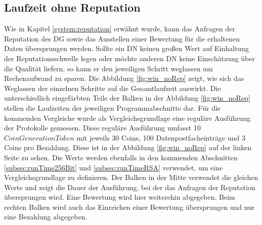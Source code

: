 \documentclass[
	fontsize=11pt,
	headings=small,
	parskip=half,           %
	bibliography=totoc,
	numbers=noenddot,       %
	open=any,               %
]{scrreprt}
\begin{document}
\subsection{Laufzeit ohne Reputation}
\label{subsec:noRep}
Wie in Kapitel \ref{system:reputation} erwähnt wurde, kann das Anfragen der Reputation des DG sowie das Ausstellen einer Bewertung für die erhaltenen Daten übersprungen werden. Sollte ein DN keinen großen Wert auf Einhaltung der Reputationsschwelle legen oder möchte anderen DN keine Einschätzung über die Qualität liefern, so kann er den jeweiligen Schritt weglassen um Rechenaufwand zu sparen. Die Abbildung \ref{fig:win_noRep} zeigt, wie sich das Weglassen der einzelnen Schritte auf die Gesamtlaufzeit auswirkt.
Die unterschiedlich eingefärbten Teile der Balken in der Abbildung \ref{fig:win_noRep} stellen die Laufzeiten der jeweiligen Programmabschnitte dar. Für die kommenden Vergleiche wurde als Vergleichsgrundlage eine reguläre Ausführung der Protokolle gemessen. Diese reguläre Ausführung umfasst 10 $CoinGenerationToken$ mit jeweils 30 Coins, 100 Datenpostfacheinträge und 3 Coins pro Bezahlung. Diese ist in der Abbildung \ref{fig:win_noRep} auf der linken Seite zu sehen. Die Werte werden ebenfalls in den kommenden Abschnitten \ref{subsec:runTime256Bit} und \ref{subsec:runTimeRSA} verwendet, um eine Vergleichsgrundlage zu definieren. Der Balken in der Mitte verwendet die gleichen Werte und zeigt die Dauer der Ausführung, bei der das Anfragen der Reputation übersprungen wird. Eine Bewertung wird hier weiterehin abgegeben. Beim rechten Balken wird auch das Einreichen einer Bewertung übersprungen und nur eine Bezahlung abgegeben.
\end{document}
